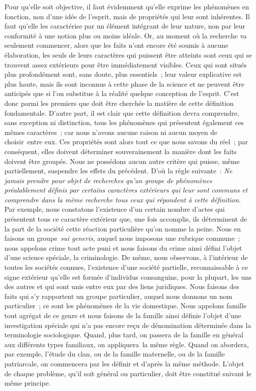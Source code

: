 \documentclass[french,twoside]{book} %
\begin{document}
Pour qu’elle soit objective, il faut évidemment qu’elle exprime les phénomènes en fonction, non d’une idée de l’esprit, mais de propriétés qui leur sont inhérentes. Il faut qu’elle les caractérise par un élément intégrant de leur nature, non par leur conformité à une notion plus ou moins idéale. Or, au moment où la recherche va seulement commencer, alors que les faits n’ont encore été soumis à aucune élaboration, les seuls de leurs caractères qui puissent être atteints sont ceux qui se trouvent assez extérieurs pour être immédiatement visibles. Ceux qui sont situés plus profondément sont, sans doute, plus essentiels ; leur valeur explicative est plus haute, mais ils sont inconnus à cette phase de la science et ne peuvent être anticipés que si l’on substitue à la réalité quelque conception de l’esprit. C’est donc parmi les premiers que doit être cherchée la matière de cette définition fondamentale. D’autre part, il est clair que cette définition devra comprendre, sans exception ni distinction, tous les phénomènes qui présentent également ces mêmes caractères ; car nous n’avons aucune raison ni aucun moyen de choisir entre eux. Ces propriétés sont alors tout ce que nous savons du réel ; par conséquent, elles doivent déterminer souverainement la manière dont les faits doivent être groupés. Nous ne possédons aucun autre critère qui puisse, même partiellement, suspendre les effets du précédent. D’où la règle suivante : {\itshape Ne jamais prendre pour objet de recherches qu’un groupe de phénomènes préalablement définis par certains caractères extérieurs qui leur sont communs et comprendre dans la même recherche tous ceux qui répondent à cette définition.} Par exemple, nous constatons l’existence d’un certain nombre d’actes qui présentent tous ce caractère extérieur que, une fois accomplis, ils déterminent de la part de la société cette réaction particulière qu’on nomme la peine. Nous en faisons un groupe {\itshape sui generis}, auquel nous imposons une rubrique commune ; nous appelons crime tout acte puni et nous faisons du crime ainsi défini l’objet d’une science spéciale, la criminologie. De même, nous observons, à l’intérieur de toutes les sociétés connues, l’existence d’une société partielle, reconnaissable à ce signe extérieur qu’elle est formée d’individus consanguins, pour la plupart, les uns des autres et qui sont unis entre eux par des liens juridiques. Nous faisons des faits qui s’y rapportent un groupe particulier, auquel nous donnons un nom particulier ; ce sont les phénomènes de la vie domestique. Nous appelons famille tout agrégat de ce genre et nous faisons de la famille ainsi définie l’objet d’une investigation spéciale qui n’a pas encore reçu de dénomination déterminée dans la terminologie sociologique. Quand, plus tard, on passera de la famille en général aux différents types familiaux, on appliquera la même règle. Quand on abordera, par exemple, l’étude du clan, ou de la famille maternelle, ou de la famille patriarcale, on commencera par les définir et d’après la même méthode. L’objet de chaque problème, qu’il soit général ou particulier, doit être constitué suivant le même principe.\par
\end{document}
